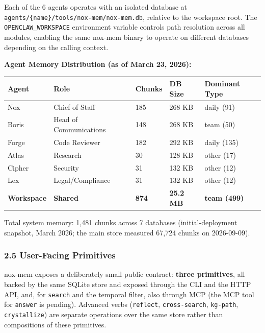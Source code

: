 \documentclass[
]{article}
\newcounter{none} %
\begin{document}
Each of the 6 agents operates with an isolated database at
\texttt{agents/\{name\}/tools/nox-mem/nox-mem.db}, relative to the
workspace root. The \texttt{OPENCLAW\_WORKSPACE} environment variable
controls path resolution across all modules, enabling the same nox-mem
binary to operate on different databases depending on the calling
context.

\textbf{Agent Memory Distribution (as of March 23, 2026):}

{\def\LTcaptype{none} %
\begin{longtable}[]{@{}lllll@{}}
\toprule\noalign{}
Agent & Role & Chunks & DB Size & Dominant Type \\
\midrule\noalign{}
\endhead
\bottomrule\noalign{}
\endlastfoot
Nox & Chief of Staff & 185 & 268 KB & daily (91) \\
Boris & Head of Communications & 148 & 268 KB & team (50) \\
Forge & Code Reviewer & 182 & 292 KB & daily (135) \\
Atlas & Research & 30 & 128 KB & other (17) \\
Cipher & Security & 31 & 132 KB & other (12) \\
Lex & Legal/Compliance & 31 & 132 KB & other (12) \\
\textbf{Workspace} & \textbf{Shared} & \textbf{874} & \textbf{25.2 MB} &
\textbf{team (499)} \\
\end{longtable}
}

Total system memory: 1,481 chunks across 7 databases (initial-deployment
snapshot, March 2026; the main store measured 67,724 chunks on
2026-09-09).

\subsubsection{2.5 User-Facing Primitives}\label{user-facing-primitives}

nox-mem exposes a deliberately small public contract: \textbf{three
primitives}, all backed by the same SQLite store and exposed through the
CLI and the HTTP API, and, for \texttt{search} and the temporal filter,
also through MCP (the MCP tool for \texttt{answer} is pending). Advanced
verbs (\texttt{reflect}, \texttt{cross-search}, \texttt{kg-path},
\texttt{crystallize}) are separate operations over the same store rather
than compositions of these primitives.
\end{document}
